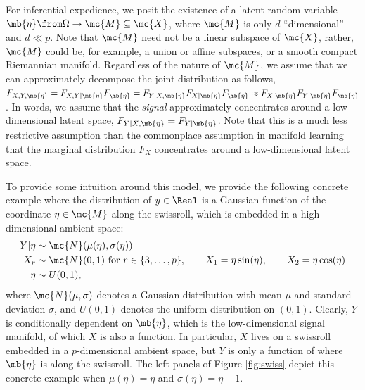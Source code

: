 For inferential expedience, we  posit the existence of  a latent random variable $\mb{\eta} \from \Omega \to \mc{M} \subseteq \mc{X}$, where $\mc{M}$ is only $d$ ``dimensional'' and $d \ll p$.   
Note that $\mc{M}$ need not be a linear subspace of $\mc{X}$, rather, $\mc{M}$ could be, for example,  a union or affine subspaces, or a smooth compact Riemannian manifold.  Regardless of the nature of $\mc{M}$, we assume that we can approximately decompose the joint distribution as follows,  $F_{X,Y,\mb{\eta}}=F_{X,Y|\mb{\eta}}F_{\mb{\eta}} = F_{Y|X, \mb{\eta}} F_{X | \mb{\eta}} F_{\mb{\eta}} \approx F_{X|\mb{\eta}} F_{Y|\mb{\eta}} F_{\mb{\eta}}$.  In  words, we assume that the \emph{signal} approximately concentrates around a low-dimensional latent space, $F_{Y|X,\mb{\eta}}=F_{Y|\mb{\eta}}$.  Note that this is a much less restrictive assumption than the commonplace assumption in manifold learning that the marginal distribution $F_X$ concentrates around a low-dimensional latent space. 

To provide some intuition around this model, we provide the following concrete example where the distribution of $y \in \Real$ is a Gaussian function of the coordinate $\eta \in \mc{M}$ along the swissroll, which is embedded in a high-dimensional ambient space:
\begin{subequations} \label{eq:linear}
\begin{align}
	Y | \eta &\sim \mc{N}(\mu(\eta) ,\sigma(\eta)) \\
X_r &\sim \mc{N}(0,1) \text{ for } r \in \{3, \ldots, p\}, \qquad 	X_1 = \eta \sin (\eta), \qquad X_2 = \eta \cos (\eta) \\
	\eta  &\sim U(0,1), 
\end{align}
\end{subequations}
where $\mc{N}(\mu,\sigma)$ denotes a Gaussian distribution with mean $\mu$ and standard deviation $\sigma$, and $U(0,1)$ denotes the uniform distribution on $(0,1)$.
Clearly, $Y$ is conditionally dependent on $\mb{\eta}$, which is the low-dimensional signal manifold, of which $X$ is also a function.  In particular, $X$ lives on a swissroll embedded in a $p$-dimensional ambient space, but $Y$ is only a function of where $\mb{\eta}$ is along the swissroll. The left panels of Figure \ref{fig:swiss} depict this concrete example when $\mu(\eta)=\eta$ and $\sigma(\eta)=\eta + 1$.


